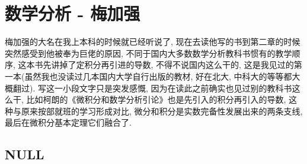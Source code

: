 \chapter{数学分析 - 梅加强}

梅加强的大名在我上本科的时候就已经听说了, 现在去读他写的书到第二章的时候突然感受到他被奉为巨佬的原因, 不同于国内大多数数学分析教科书惯有的教学顺序,
这本书先讲掉了定积分再引进的导数, 不得不说国内这么干的, 这是我见过的第一本(虽然我也没读过几本国内大学自行出版的教材, 好在北大,
中科大的等等都大概翻过). 写这一小段文字只是突发感慨, 因为在读此之前确实也见过别的教科书这么干, 比如柯朗的《微积分和数学分析引论》也是先引入的积分再引入的导数,
这种与原来按部就班的学习形成对比, 微分和积分是实数完备性发展出来的两条支线, 最后在微积分基本定理它们融合了.

\section{NULL}






